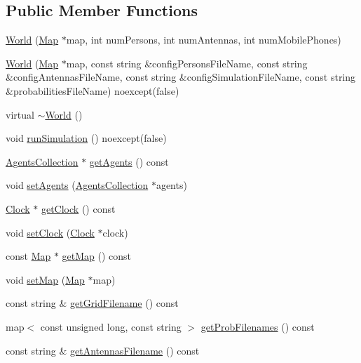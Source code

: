 \subsection*{Public Member Functions}
\begin{DoxyCompactItemize}
\item 
\hyperlink{class_world_a94871f094bb3eabb67f5bd1b10396832}{World} (\hyperlink{class_map}{Map} $\ast$map, int num\+Persons, int num\+Antennas, int num\+Mobile\+Phones)
\item 
\hyperlink{class_world_adeb8454b3713d9dc1d05ca1f901e7b77}{World} (\hyperlink{class_map}{Map} $\ast$map, const string \&config\+Persons\+File\+Name, const string \&config\+Antennas\+File\+Name, const string \&config\+Simulation\+File\+Name, const string \&probabilities\+File\+Name) noexcept(false)
\item 
virtual \hyperlink{class_world_a9ce9875f5e35e293661857e4a2c1d2e4}{$\sim$\+World} ()
\item 
void \hyperlink{class_world_aa825a43f968c8fe750c67156e64721ff}{run\+Simulation} () noexcept(false)
\item 
\hyperlink{class_agents_collection}{Agents\+Collection} $\ast$ \hyperlink{class_world_a8cf8a54ae1f3cb61efeba2b3acebb7cc}{get\+Agents} () const
\item 
void \hyperlink{class_world_afa8e5c2943c72aa664590abbb024896b}{set\+Agents} (\hyperlink{class_agents_collection}{Agents\+Collection} $\ast$agents)
\item 
\hyperlink{class_clock}{Clock} $\ast$ \hyperlink{class_world_a79423d285338cbe0ea501369e93e78b4}{get\+Clock} () const
\item 
void \hyperlink{class_world_a52ebe3eed240fe4dd37915a1dad02efd}{set\+Clock} (\hyperlink{class_clock}{Clock} $\ast$clock)
\item 
const \hyperlink{class_map}{Map} $\ast$ \hyperlink{class_world_a33b8543ee812ae4f8ff93329444da4cb}{get\+Map} () const
\item 
void \hyperlink{class_world_a9dc80487d5c2d1d4f2af0c1d7f015204}{set\+Map} (\hyperlink{class_map}{Map} $\ast$map)
\item 
const string \& \hyperlink{class_world_a7d07b06f9884185161c5cc34034a7212}{get\+Grid\+Filename} () const
\item 
map$<$ const unsigned long, const string $>$ \hyperlink{class_world_a026bdf1e190cdaf02481c548b8ca1a6f}{get\+Prob\+Filenames} () const
\item 
const string \& \hyperlink{class_world_a5baa256a1e856e635830e0a1c9cce37b}{get\+Antennas\+Filename} () const

\end{DoxyCompactItemize}
